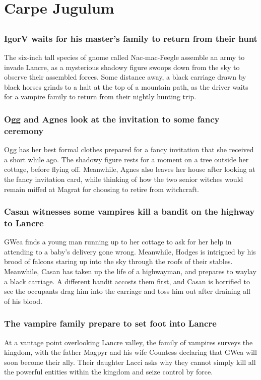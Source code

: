 \section{Carpe Jugulum}


\subsection{}
\subsubsection{\Gls{IgorV} waits for his master's family to return from their hunt}
The six-inch tall species of gnome called Nac-mac-Feegle assemble an army to invade Lancre, as a
mysterious shadowy figure swoops down from the sky to observe their assembled forces. Some distance
away, a black carriage drawn by black horses grinds to a halt at the top of a mountain path, as the
driver waits for a vampire family to return from their nightly hunting trip.

\subsubsection{\Gls{Ogg} and \Gls{Agnes} look at the invitation to some fancy ceremony}
\Gls{Ogg} has her best formal clothes prepared for a fancy invitation that she received a short
while ago. The shadowy figure rests for a moment on a tree outside her cottage, before flying off.
Meanwhile, \Gls{Agnes} also leaves her house after looking at the fancy invitation card, while
thinking of how the two senior witches would remain miffed at \Gls{Magrat} for choosing to retire
from witchcraft.

\subsubsection{\Gls{Casan} witnesses some vampires kill a bandit on the highway to Lancre}
\Gls{GWea} finds a young man running up to her cottage to ask for her help in attending to a
baby's delivery gone wrong. Meanwhile, \Gls{Hodges} is intrigued by his brood of falcons staring
up into the sky through the roofs of their stables. Meanwhile, \Gls{Casan} has taken up the life
of a highwayman, and prepares to waylay a black carriage. A different bandit accosts them first,
and \Gls{Casan} is horrified to see the occupants drag him into the carriage and toss him out after
draining all of his blood.

\subsubsection{The vampire family prepare to set foot into Lancre}
At a vantage point overlooking Lancre valley, the family of vampires surveys the kingdom, with
the father \Gls{Magpyr} and his wife \Gls{Countess} declaring that \Gls{GWea} will soon become their
ally. Their daughter \Gls{Lacci} asks why they cannot simply kill all the powerful entities within
the kingdom and seize control by force.

